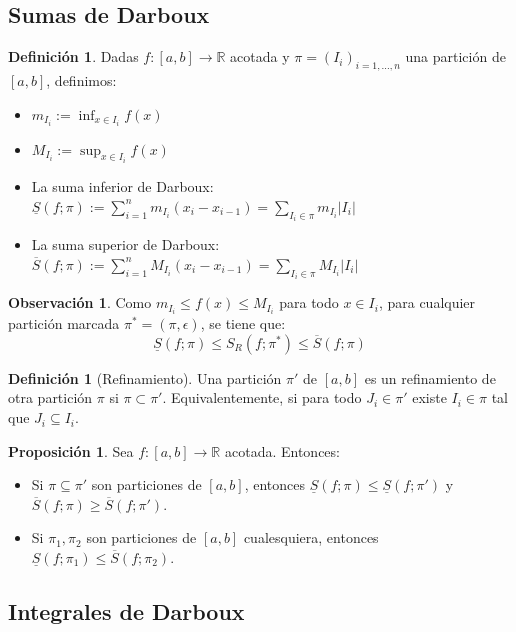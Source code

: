 \documentclass[11pt]{article}
\theoremstyle{definition} %
\newtheorem{proposition}[theorem]{Proposición}
\newtheorem{definition}[theorem]{Definición}
\newtheorem{remark}[theorem]{Observación}
\begin{document}
\subsection{Sumas de Darboux}
\label{sec:darboux}

\begin{definition}
Dadas $f:[a,b] \rightarrow \mathbb{R}$ acotada y $\pi = (I_i)_{i=1,\dots,n}$ una partición de $[a,b]$, definimos:
\begin{itemize}
    \item $m_{I_i} := \inf_{x \in I_i} f(x)$
    \item $M_{I_i} := \sup_{x \in I_i} f(x)$
    \item La suma inferior de Darboux: $\underline{S}(f; \pi) := \sum_{i=1}^{n} m_{I_i}(x_i - x_{i-1}) = \sum_{I_i \in \pi} m_{I_i} |I_i|$
    \item La suma superior de Darboux: $\overline{S}(f; \pi) := \sum_{i=1}^{n} M_{I_i}(x_i - x_{i-1}) = \sum_{I_i \in \pi} M_{I_i} |I_i|$
\end{itemize}
\end{definition}

\begin{remark}
Como $m_{I_i} \le f(x) \le M_{I_i}$ para todo $x \in I_i$, para cualquier partición marcada $\pi^* = (\pi, \epsilon)$, se tiene que:
$$ \underline{S}(f; \pi) \le S_R(f; \pi^*) \le \overline{S}(f; \pi) $$
\end{remark}

\begin{definition}[Refinamiento]
Una partición $\pi'$ de $[a,b]$ es un refinamiento de otra partición $\pi$ si $\pi \subset \pi'$. Equivalentemente, si para todo $J_i \in \pi'$ existe $I_i \in \pi$ tal que $J_i \subseteq I_i$.
\end{definition}

\begin{proposition}
Sea $f:[a,b] \rightarrow \mathbb{R}$ acotada. Entonces:
\begin{itemize}
    \item Si $\pi \subseteq \pi'$ son particiones de $[a,b]$, entonces $\underline{S}(f;\pi) \le \underline{S}(f;\pi')$ y $\overline{S}(f;\pi) \ge \overline{S}(f;\pi')$.
    \item Si $\pi_1, \pi_2$ son particiones de $[a,b]$ cualesquiera, entonces $\underline{S}(f;\pi_1) \le \overline{S}(f;\pi_2)$.
\end{itemize}
\end{proposition}

\subsection{Integrales de Darboux}
\label{sec:darboux-integrals}
\end{document}

